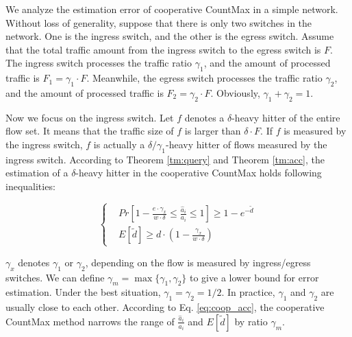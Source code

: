 We analyze the estimation error of cooperative CountMax in a simple network. Without loss of generality, suppose that there is only two switches in the network. One is the ingress switch, and the other is the egress switch. Assume that the total traffic amount from the ingress switch to the egress switch is $F$. The ingress switch processes the traffic ratio $\gamma_1 $, and the amount of processed traffic is $F_1 =\gamma_1\cdot F $. Meanwhile, the egress switch processes the traffic ratio $\gamma_2 $, and the amount of processed traffic is $F_2 =\gamma_2 \cdot F $. Obviously, $\gamma_1 + \gamma_2 = 1$. 


Now we focus on the ingress switch. Let $f$ denotes a $\delta$-heavy hitter of the entire flow set. It means that the traffic size of $f$ is larger than $\delta \cdot F$. If $f$ is measured by the ingress switch, %
 $f$ is actually a $\delta/\gamma_1$-heavy hitter of flows measured by the ingress switch. According to Theorem \ref{tm:query} and Theorem \ref{tm:acc}, the estimation of a $\delta$-heavy hitter in the cooperative CountMax holds following inequalities:

\begin{equation}\label{eq:coop_acc}
\left\{
\begin{aligned}
&Pr[1-\frac{e\cdot \gamma_x}{w\cdot \delta}\le \frac{\hat{a}_i}{a_i} \le 1] \ge 1-e^{-\tilde{d}}\\
&E[\tilde{d}]\ge d\cdot(1-\frac{\gamma_x}{w\cdot\delta})
\end{aligned}
\right.
\end{equation}

$\gamma_x$ denotes $\gamma_1$ or $\gamma_2$, depending on the flow is measured by ingress/egress switches. We can define $\gamma_m = \max \{\gamma_1, \gamma_2\}$ to give a lower bound for error estimation. Under the best situation, $\gamma_1=\gamma_2=1/2$. In practice, $\gamma_1$ and $\gamma_2$ are usually close to each other. According to Eq. \eqref{eq:coop_acc}, the cooperative CountMax method narrows the range of $\frac{\hat{a}_i}{a_i}$ and $E[\tilde{d}]$ by ratio $\gamma_m $.






